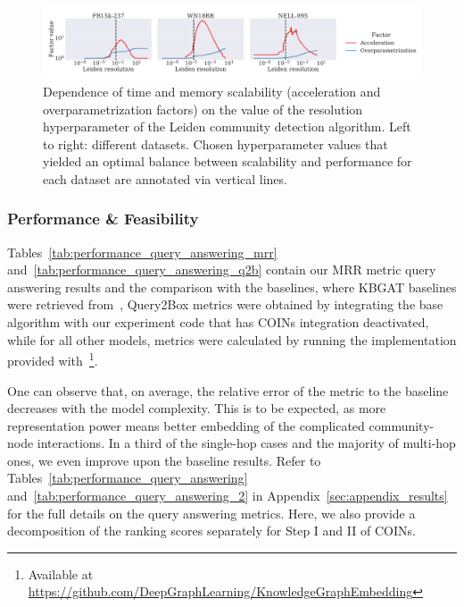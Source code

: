 \begin{figure}[H]
\begin{center}
\includegraphics[width=\textwidth]{figures/coins/scalability_leiden_resolution}
\end{center}
\caption[Dependence of time and memory scalability on the value of the resolution hyperparameter of the Leiden community detection algorithm.]{Dependence of time and memory scalability (acceleration and overparametrization factors) on the value of the resolution hyperparameter of the Leiden community detection algorithm. Left to right: different datasets. Chosen hyperparameter values that yielded an optimal balance between scalability and performance for each dataset are annotated via vertical lines.}
\label{fig:scalability_resolution}
\end{figure}

\subsubsection{Performance \& Feasibility}

Tables~\ref{tab:performance_query_answering_mrr} and~\ref{tab:performance_query_answering_q2b} contain our MRR metric query answering results and the comparison with the baselines, where KBGAT baselines were retrieved from~\cite{nathani_learning_2019}, Query2Box metrics were obtained by integrating the base algorithm with our experiment code that has COINs integration deactivated, while for all other models, metrics were calculated by running the implementation provided with~\cite{sun_rotate_2019}\footnote{Available at \url{https://github.com/DeepGraphLearning/KnowledgeGraphEmbedding}}. 

One can observe that, on average, the relative error of the metric to the baseline decreases with the model complexity. This is to be expected, as more representation power means better embedding of the complicated community-node interactions. In a third of the single-hop cases and the majority of multi-hop ones, we even improve upon the baseline results. Refer to Tables~\ref{tab:performance_query_answering} and~\ref{tab:performance_query_answering_2} in Appendix~\ref{sec:appendix_results} for the full details on the query answering metrics. Here, we also provide a decomposition of the ranking scores separately for Step I and II of COINs.

